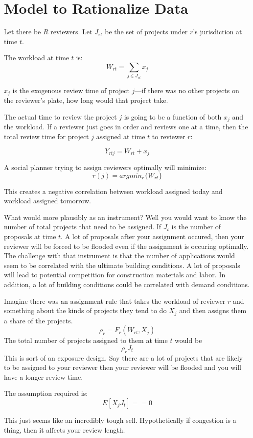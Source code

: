 \documentclass[12pt]{article}
\theoremstyle{definition}
\begin{document}
\section{Model to Rationalize Data}
Let there be $R$ reviewers. Let $J_{rt}$ be the set of projects under $r$'s jurisdiction at time $t$. 

The workload at time $t$ is:
$$W_{rt}=\sum_{j\in J_{rt}} x_j$$

$x_j$ is the exogenous review time of project $j$---if there was no other projects on the reviewer's plate, how long would that project take. 

The actual time to review the project $j$ is going to be a function of both $x_j$ and the workload. If a reviewer just goes in order and reviews one at a time, then the total review time for project $j$ assigned at time $t$ to reviewer $r$:

$$Y_{rtj} = W_{rt} + x_j$$

A social planner trying to assign reviewers optimally will minimize:
$$r(j) = argmin_r \{W_{rt}\}$$

This creates a negative correlation between workload assigned today and workload assigned tomorrow. 

What would more plausibly as an instrument? Well you would want to know the number of total projects that need to be assigned. If $J_t$ is the number of proposals at time $t$. A lot of proposals after your assignment occured, then your reviewer will be forced to be flooded even if the assignment is occuring optimally. The challenge with that instrument is that the number of applications would seem to be correlated with the ultimate building conditions. A lot of proposals will lead to potential competition for construction materials and labor. In addition, a lot of building conditions could be correlated with demand conditions. 

Imagine there was an assignment rule that takes the workload of reviewer $r$ and something about the kinds of projects they tend to do $X_j$ and then assigns them a share of the projects. 
$$\rho_{r} = F_r(W_{rt}, X_{j})$$
The total number of projects assigned to them at time $t$ would be 
$$\rho_{r}J_t$$
This is sort of an exposure design. Say there are a lot of projects that are likely to be assigned to your reviewer then your reviewer will be flooded and you will have a longer review time. 

The assumption required is:
$$E[X_jJ_t]==0$$

This just seems like an incredibly tough sell. Hypothetically if congestion is a thing, then it affects your review length. 
\end{document}
